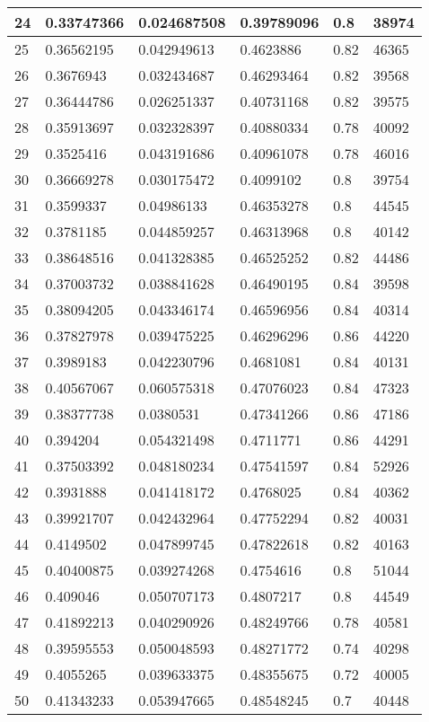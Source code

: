 \begin{longtable}{|l|l|l|l|l|l|}
24 & 0.33747366 & 0.024687508 & 0.39789096 & 0.8 & 38974 \\ \hline 
25 & 0.36562195 & 0.042949613 & 0.4623886 & 0.82 & 46365 \\ \hline 
26 & 0.3676943 & 0.032434687 & 0.46293464 & 0.82 & 39568 \\ \hline 
27 & 0.36444786 & 0.026251337 & 0.40731168 & 0.82 & 39575 \\ \hline 
28 & 0.35913697 & 0.032328397 & 0.40880334 & 0.78 & 40092 \\ \hline 
29 & 0.3525416 & 0.043191686 & 0.40961078 & 0.78 & 46016 \\ \hline 
30 & 0.36669278 & 0.030175472 & 0.4099102 & 0.8 & 39754 \\ \hline 
31 & 0.3599337 & 0.04986133 & 0.46353278 & 0.8 & 44545 \\ \hline 
32 & 0.3781185 & 0.044859257 & 0.46313968 & 0.8 & 40142 \\ \hline 
33 & 0.38648516 & 0.041328385 & 0.46525252 & 0.82 & 44486 \\ \hline 
34 & 0.37003732 & 0.038841628 & 0.46490195 & 0.84 & 39598 \\ \hline 
35 & 0.38094205 & 0.043346174 & 0.46596956 & 0.84 & 40314 \\ \hline 
36 & 0.37827978 & 0.039475225 & 0.46296296 & 0.86 & 44220 \\ \hline 
37 & 0.3989183 & 0.042230796 & 0.4681081 & 0.84 & 40131 \\ \hline 
38 & 0.40567067 & 0.060575318 & 0.47076023 & 0.84 & 47323 \\ \hline 
39 & 0.38377738 & 0.0380531 & 0.47341266 & 0.86 & 47186 \\ \hline 
40 & 0.394204 & 0.054321498 & 0.4711771 & 0.86 & 44291 \\ \hline 
41 & 0.37503392 & 0.048180234 & 0.47541597 & 0.84 & 52926 \\ \hline 
42 & 0.3931888 & 0.041418172 & 0.4768025 & 0.84 & 40362 \\ \hline 
43 & 0.39921707 & 0.042432964 & 0.47752294 & 0.82 & 40031 \\ \hline 
44 & 0.4149502 & 0.047899745 & 0.47822618 & 0.82 & 40163 \\ \hline 
45 & 0.40400875 & 0.039274268 & 0.4754616 & 0.8 & 51044 \\ \hline 
46 & 0.409046 & 0.050707173 & 0.4807217 & 0.8 & 44549 \\ \hline 
47 & 0.41892213 & 0.040290926 & 0.48249766 & 0.78 & 40581 \\ \hline 
48 & 0.39595553 & 0.050048593 & 0.48271772 & 0.74 & 40298 \\ \hline 
49 & 0.4055265 & 0.039633375 & 0.48355675 & 0.72 & 40005 \\ \hline 
50 & 0.41343233 & 0.053947665 & 0.48548245 & 0.7 & 40448 \\ \hline 
\end{longtable}